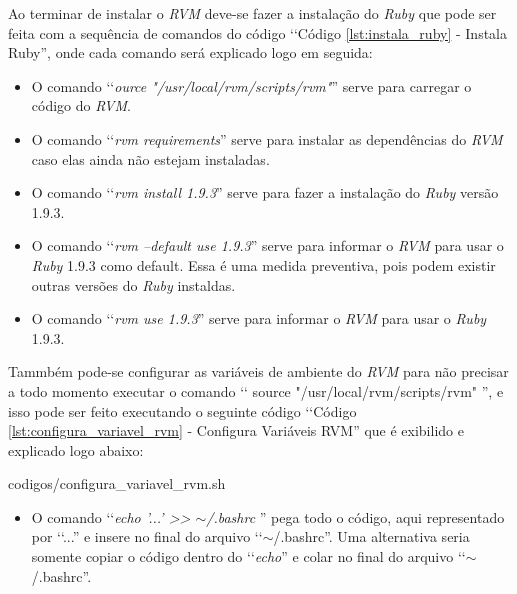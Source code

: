 Ao terminar de instalar o \emph{RVM} deve-se fazer a instalação do \emph{Ruby} que pode ser feita com a 
sequência de comandos do código ‘‘Código \ref{lst:instala_ruby} - Instala Ruby'', onde cada comando será 
explicado logo em seguida:
 

 
\begin{itemize}

 \item O comando ‘‘\emph{ource "/usr/local/rvm/scripts/rvm"}'' serve para carregar o código do \emph{RVM}.
 
 \item O comando ‘‘\emph{rvm requirements}'' serve para instalar as dependências do \emph{RVM} caso elas 
 ainda não estejam instaladas.
 
 \item O comando ‘‘\emph{rvm install 1.9.3}'' serve para fazer a instalação do \emph{Ruby} versão 1.9.3.
 
 \item O comando ‘‘\emph{rvm --default use 1.9.3}'' serve para informar o \emph{RVM} para usar o \emph{Ruby}
 1.9.3 como default. Essa é uma medida preventiva, pois podem existir outras versões do \emph{Ruby} instaldas.
 
 \item O comando ‘‘\emph{rvm use 1.9.3}'' serve para informar o \emph{RVM} para usar o \emph{Ruby} 1.9.3.
 
\end{itemize}

  
Tammbém pode-se configurar as variáveis de ambiente do \emph{RVM} para não precisar a todo momento executar
o comando ‘‘ source "/usr/local/rvm/scripts/rvm" '', e isso pode ser feito executando o seguinte código
‘‘Código \ref{lst:configura_variavel_rvm} - Configura Variáveis RVM'' que é exibilido e explicado logo abaixo:
 

{codigos/configura_variavel_rvm.sh}
 
\begin{itemize}

  \item O comando ‘‘\emph{echo '...' >> $\sim$/.bashrc }'' pega todo o código, aqui representado por ‘‘...'' 
  e insere no final do arquivo ‘‘$\sim$/.bashrc''. Uma alternativa seria somente copiar o código dentro do 
  ‘‘\emph{echo}'' e colar no final do arquivo ‘‘$\sim$/.bashrc''.
  
\end{itemize}

